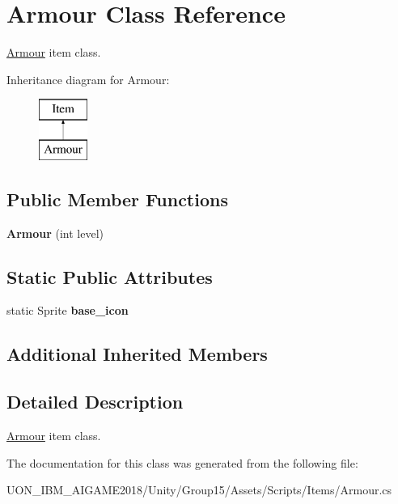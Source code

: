\hypertarget{class_armour}{}\section{Armour Class Reference}
\label{class_armour}


\mbox{\hyperlink{class_armour}{Armour}} item class.  


Inheritance diagram for Armour\+:\begin{figure}[H]
\begin{center}
\leavevmode
\includegraphics[height=2.000000cm]{class_armour}
\end{center}
\end{figure}
\subsection*{Public Member Functions}
\begin{DoxyCompactItemize}
\item 
\mbox{\label{class_armour_a8e1de059e6735d359e21f097deb9780a}} 
{\bfseries Armour} (int level)
\end{DoxyCompactItemize}
\subsection*{Static Public Attributes}
\begin{DoxyCompactItemize}
\item 
\mbox{\label{class_armour_a56724d438f4846ffd01202ec5fb87a80}} 
static Sprite {\bfseries base\+\_\+icon}
\end{DoxyCompactItemize}
\subsection*{Additional Inherited Members}


\subsection{Detailed Description}
\mbox{\hyperlink{class_armour}{Armour}} item class. 

The documentation for this class was generated from the following file\+:\begin{DoxyCompactItemize}
\item 
U\+O\+N\+\_\+\+I\+B\+M\+\_\+\+A\+I\+G\+A\+M\+E2018/\+Unity/\+Group15/\+Assets/\+Scripts/\+Items/Armour.\+cs\end{DoxyCompactItemize}
